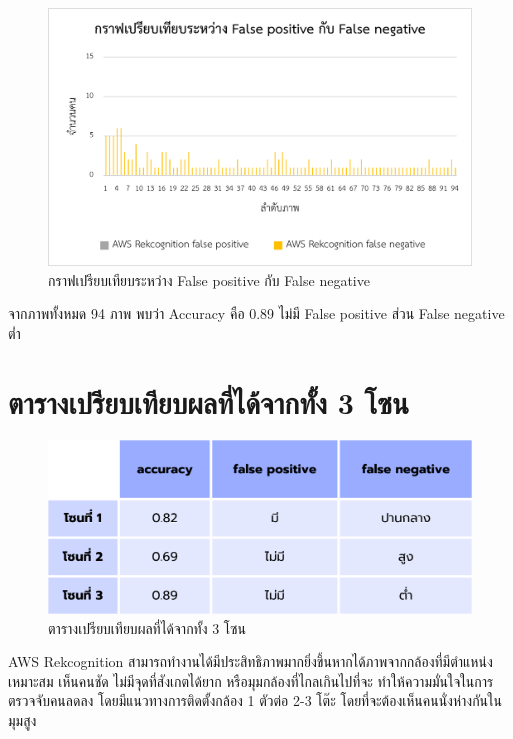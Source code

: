 \begin{figure}[ht]
    \centering
    \includegraphics[scale=1]{images/graph2_zone3-2.png}
    \caption[graph2-3]{กราฟเปรียบเทียบระหว่าง False positive กับ False negative}
    \label{fig:graph2-3}
\end{figure}
จากภาพทั้งหมด 94 ภาพ พบว่า Accuracy คือ 0.89 ไม่มี False positive ส่วน False negative ต่ำ

\section{ตารางเปรียบเทียบผลที่ได้จากทั้ง 3 โซน}
\begin{figure}[ht]
    \centering
    \includegraphics[scale=0.5]{images/comparison.png}
    \caption[comparison]{ตารางเปรียบเทียบผลที่ได้จากทั้ง 3 โซน}
    \label{fig:comparison}
\end{figure}
AWS Rekcognition สามารถทํางานได้มีประสิทธิภาพมากยิ่งขึ้นหากได้ภาพจากกล้องที่มีตําแหน่งเหมาะสม เห็นคนชัด ไม่มีจุดที่สังเกตได้ยาก หรือมุมกล้องที่ไกลเกินไปที่จะ
ทําให้ความมั่นใจในการตรวจจับคนลดลง โดยมีแนวทางการติดตั้งกล้อง 1 ตัวต่อ 2-3 โต๊ะ
โดยที่จะต้องเห็นคนนั่งห่างกันในมุมสูง

